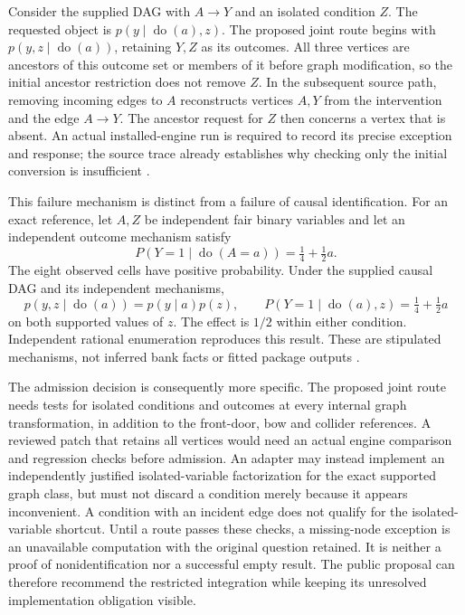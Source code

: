 Consider the supplied DAG with \(A\to Y\) and an isolated condition \(Z\).
The requested object is \(p(y\mid\operatorname{do}(a),z)\). The proposed
joint route begins with \(p(y,z\mid\operatorname{do}(a))\), retaining
\(Y,Z\) as its outcomes. All three vertices are ancestors of this outcome
set or members of it before graph modification, so the initial ancestor
restriction does not remove \(Z\). In the subsequent source path, removing
incoming edges to \(A\) reconstructs vertices \(A,Y\) from the intervention
and the edge \(A\to Y\). The ancestor request for \(Z\) then concerns a
vertex that is absent. An actual installed-engine run is required to record
its precise exception and response; the source trace already establishes
why checking only the initial conversion is insufficient
\citep{exec13_isolated_reference}.

This failure mechanism is distinct from a failure of causal identification.
For an exact reference, let \(A,Z\) be independent fair binary variables and
let an independent outcome mechanism satisfy
\[
 P(Y=1\mid\operatorname{do}(A=a))=\tfrac14+\tfrac12a.
\]
The eight observed cells have positive probability. Under the supplied
causal DAG and its independent mechanisms,
\[
 p(y,z\mid\operatorname{do}(a))=p(y\mid a)p(z),\qquad
 P(Y=1\mid\operatorname{do}(a),z)=\tfrac14+\tfrac12a
\]
on both supported values of \(z\). The effect is \(1/2\) within either
condition. Independent rational enumeration reproduces this result. These
are stipulated mechanisms, not inferred bank facts or fitted package
outputs \citep{exec13_isolated_reference}.

The admission decision is consequently more specific. The proposed joint
route needs tests for isolated conditions and outcomes at every internal
graph transformation, in addition to the front-door, bow and collider
references. A reviewed patch that retains all vertices would need an actual
engine comparison and regression checks before admission. An adapter may
instead implement an independently justified isolated-variable factorization
for the exact supported graph class, but must not discard a condition merely
because it appears inconvenient. A condition with an incident edge does not
qualify for the isolated-variable shortcut. Until a route passes these
checks, a missing-node exception is an unavailable computation with the
original question retained. It is neither a proof of nonidentification nor
a successful empty result. The public proposal can therefore recommend the
restricted integration while keeping its unresolved implementation obligation
visible.
\label{exec13:isolated-condition-end}


